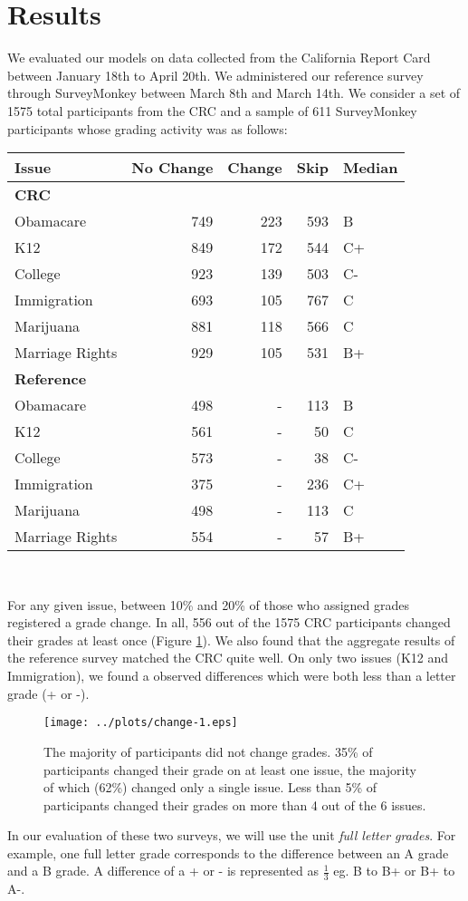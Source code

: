 \section{Results}
We evaluated our models on data collected from the California Report Card between January 18th to April 20th.
We administered our reference survey through SurveyMonkey between March 8th and March 14th.
We consider a set of 1575 total participants from the CRC and a sample of 611 SurveyMonkey participants whose grading activity was as follows:\\[1\baselineskip]

{\centering\scriptsize
\begin{tabular}[!ht]{ l | r | r | r | l }
Issue & No Change & Change & Skip & Median \\
\hline
\hline
  \multicolumn{5}{l}{\textbf{CRC}}\\
  \hline
  Obamacare & 749 & 223 & 593 & B \\
  \hline
  K12 & 849 & 172 & 544 & C+ \\
  \hline
  College & 923 & 139 & 503 & C-\\
  \hline
  Immigration & 693 & 105 & 767 & C \\
  \hline
  Marijuana & 881 & 118 & 566 & C \\
  \hline
  Marriage Rights & 929 & 105 & 531 & B+\\
\hline
\hline
\multicolumn{5}{l}{\textbf{Reference}}\\
\hline
  Obamacare & 498 & - & 113 & B \\
  \hline
  K12 & 561 & - & 50 & C \\
  \hline
  College & 573 & - & 38 & C-\\
  \hline
  Immigration & 375 & - & 236 & C+ \\
  \hline
  Marijuana & 498 & - & 113 & C \\
  \hline
  Marriage Rights & 554 & - & 57 & B+
\end{tabular}\\[1\baselineskip]
}

For any given issue, between 10\% and 20\% of those who assigned grades registered a grade change.
In all, 556 out of the 1575 CRC participants changed their grades at least once (Figure \ref{change-1}).
We also found that the aggregate results of the reference survey matched the CRC quite well.
On only two issues (K12 and Immigration), we found a observed differences which were both less than a letter grade (+ or -).
\begin{figure}[h]
\vspace{-1.5em}
  \centering
    \texttt{[image: ../plots/change-1.eps]}
      \caption{The majority of participants did not change grades. 35\% of participants changed their grade on at least one issue, the majority of which (62\%) changed only a single issue. Less than 5\% of participants changed their grades on more than 4 out of the 6 issues.}
      \label{change-1}
\end{figure}
In our evaluation of these two surveys, we will use the unit \emph{full letter grades}.
For example, one full letter grade corresponds to the difference between an A grade and a B grade. 
A difference of a + or - is represented as $\frac{1}{3}$ eg. B to B+ or B+ to A-. 
